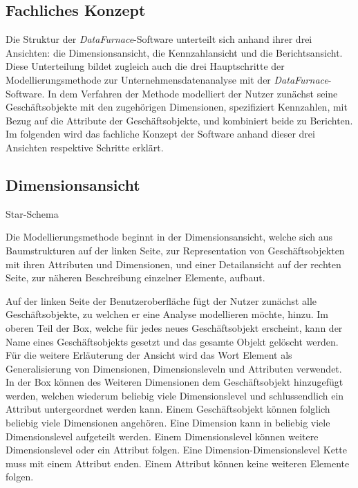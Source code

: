 \documentclass[
  language=german, %
  type=bachelor%
]{isthesis}
\begin{document}
\begin{content}


  \section{Fachliches Konzept}

  Die Struktur der \textit{DataFurnace}-Software unterteilt sich anhand ihrer
  drei Ansichten: die Dimensionsansicht, die Kennzahlansicht und die
  Berichtsansicht. Diese Unterteilung bildet zugleich auch die drei
  Hauptschritte der Modellierungsmethode zur Unternehmensdatenanalyse mit der
  \textit{DataFurnace}-Software. In dem Verfahren der Methode modelliert der
  Nutzer zunächst seine Geschäftsobjekte mit den zugehörigen Dimensionen,
  spezifiziert Kennzahlen, mit Bezug auf die Attribute der Geschäftsobjekte,
  und kombiniert beide zu Berichten. Im folgenden wird das fachliche Konzept
  der Software anhand dieser drei Ansichten respektive Schritte erklärt.




  \subsection{Dimensionsansicht}
  Star-Schema

  Die Modellierungsmethode beginnt in der Dimensionsansicht, welche sich aus
  Baumstrukturen auf der linken Seite, zur Representation von
  Geschäftsobjekten mit ihren Attributen und Dimensionen, und einer
  Detailansicht auf der rechten Seite, zur näheren Beschreibung einzelner
  Elemente, aufbaut. 

  Auf der linken Seite der Benutzeroberfläche fügt der Nutzer zunächst alle
  Geschäftsobjekte, zu welchen er eine Analyse modellieren möchte, hinzu. Im oberen Teil der
  Box, welche für jedes neues Geschäftsobjekt erscheint, kann der Name eines
  Geschäftsobjekts gesetzt und das gesamte Objekt gelöscht werden. Für die
  weitere Erläuterung der Ansicht wird das Wort Element als Generalisierung von
  Dimensionen, Dimensionsleveln und Attributen verwendet. In der Box können des
  Weiteren Dimensionen dem Geschäftsobjekt hinzugefügt werden, welchen
  wiederum beliebig viele Dimensionslevel und schlussendlich ein Attribut
	untergeordnet werden kann. Einem Geschäftsobjekt können folglich beliebig viele
	Dimensionen angehören. Eine Dimension kann in beliebig viele Dimensionslevel
	aufgeteilt werden. Einem Dimensionslevel können weitere Dimensionslevel oder
	ein Attribut folgen. Eine Dimension-Dimensionslevel Kette muss mit einem
	Attribut enden. Einem Attribut können keine weiteren Elemente
	folgen. 
	

\end{content}
\end{document}
